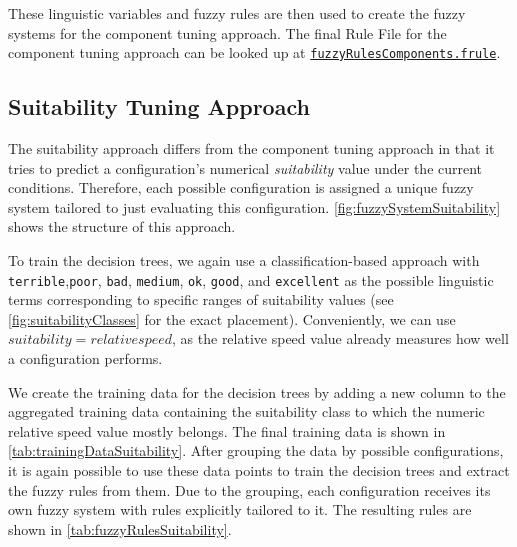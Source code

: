 These linguistic variables and fuzzy rules are then used to create the fuzzy systems for the component tuning approach. The final Rule File for the component tuning approach can be looked up at \href{https://github.com/AutoPas/AutoPas/blob/f77f10f72c19a86d5471bce287ae3a4ae344c012/examples/md-flexible/input/fuzzyRulesComponents.frule}{\color{blue}\texttt{fuzzyRulesComponents.frule}}.


\subsection{Suitability Tuning Approach}

The suitability approach differs from the component tuning approach in that it tries to predict a configuration's numerical \emph{suitability} value under the current conditions. Therefore, each possible configuration is assigned a unique fuzzy system tailored to just evaluating this configuration. \autoref{fig:fuzzySystemSuitability} shows the structure of this approach.

To train the decision trees, we again use a classification-based approach with \texttt{terrible},\texttt{poor}, \texttt{bad}, \texttt{medium}, \texttt{ok}, \texttt{good}, and \texttt{excellent} as the possible linguistic terms corresponding to specific ranges of suitability values (see \autoref{fig:suitabilityClasses} for the exact placement). Conveniently, we can use $suitability= relative speed$, as the relative speed value already measures how well a configuration performs.

We create the training data for the decision trees by adding a new column to the aggregated training data containing the suitability class to which the numeric relative speed value mostly belongs. The final training data is shown in \autoref{tab:trainingDataSuitability}. After grouping the data by possible configurations, it is again possible to use these data points to train the decision trees and extract the fuzzy rules from them. Due to the grouping, each configuration receives its own fuzzy system with rules explicitly tailored to it. The resulting rules are shown in \autoref{tab:fuzzyRulesSuitability}.

